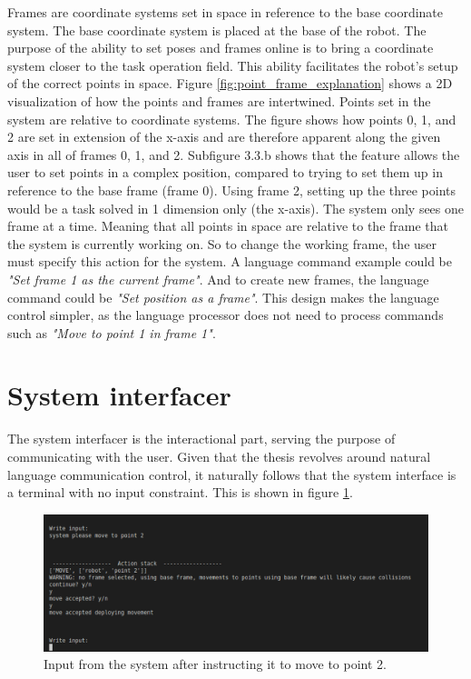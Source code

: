 Frames are coordinate systems set in space in reference to the base coordinate system. The base coordinate system is placed at the base of the robot. The purpose of the ability to set poses and frames online is to bring a coordinate system closer to the task operation field. This ability facilitates the robot's setup of the correct points in space. Figure \ref{fig:point_frame_explanation} shows a 2D visualization of how the points and frames are intertwined. 
Points set in the system are relative to coordinate systems. The figure shows how points 0, 1, and 2 are set in extension of the x-axis and are therefore apparent along the given axis in all of frames 0, 1, and 2. Subfigure 3.3.b shows that the feature allows the user to set points in a complex position, compared to trying to set them up in reference to the base frame (frame 0). Using frame 2, setting up the three points would be a task solved in 1 dimension only (the x-axis).
The system only sees one frame at a time. Meaning that all points in space are relative to the frame that the system is currently working on. So to change the working frame, the user must specify this action for the system. A language command example could be \textit{"Set frame 1 as the current frame"}. And to create new frames, the language command could be \textit{"Set position as a frame"}. This design makes the language control simpler, as the language processor does not need to process commands such as \textit{"Move to point 1 in frame 1"}.

\section{System interfacer}\label{sec:sys_overview_design}
The system interfacer is the interactional part, serving the purpose of communicating with the user. Given that the thesis revolves around natural language communication control, it naturally follows that the system interface is a terminal with no input constraint. This is shown in figure \ref{fig:overview__terminal}.

\begin{figure}[ht]
    \centering
    \includegraphics[width=13cm]{img/terminal_input.png}
    \caption{Input from the system after instructing it to move to point 2.}
    \label{fig:overview__terminal}
\end{figure}

